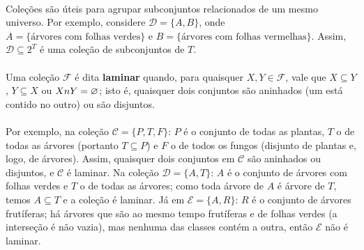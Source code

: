 \documentclass[12pt,a4paper]{article}
\def\cap{\string n}%
\begin{document}
\paragraph{}
Coleções são úteis para agrupar subconjuntos relacionados de um mesmo universo. Por exemplo, considere \(\mathcal{D} = \{A, B\}\), onde \(A = \{\text{árvores com folhas verdes}\}\) e \(B = \{\text{árvores com folhas vermelhas}\}\). Assim, \(\mathcal{D} \subseteq 2^{T}\) é uma coleção de subconjuntos de \(T\).

\paragraph{}
Uma coleção \(\mathcal{F}\) é dita \textbf{laminar} quando, para quaisquer \(X, Y \in \mathcal{F}\), vale que \(X \subseteq Y\), \(Y \subseteq X\) ou \(X \cap Y = \varnothing\); isto é, quaisquer dois conjuntos são aninhados (um está contido no outro) ou são disjuntos. 

\paragraph{}
Por exemplo, na coleção \(\mathcal{C} = \{P, T, F\}\): \(P\) é o conjunto de todas as plantas, \(T\) o de todas as árvores (portanto \(T\subseteq P\)) e \(F\) o de todos os fungos (disjunto de plantas e, logo, de árvores). Assim, quaisquer dois conjuntos em \(\mathcal{C}\) são aninhados ou disjuntos, e \(\mathcal{C}\) é laminar. Na coleção \(\mathcal{D} = \{A, T\}\): \(A\) é o conjunto de árvores com folhas verdes e \(T\) o de todas as árvores; como toda árvore de \(A\) é árvore de \(T\), temos \(A\subseteq T\) e a coleção é laminar. Já em \(\mathcal{E} = \{A, R\}\): \(R\) é o conjunto de árvores frutíferas; há árvores que são ao mesmo tempo frutíferas e de folhas verdes (a interseção é não vazia), mas nenhuma das classes contém a outra, então \(\mathcal{E}\) não é laminar.
\end{document}
